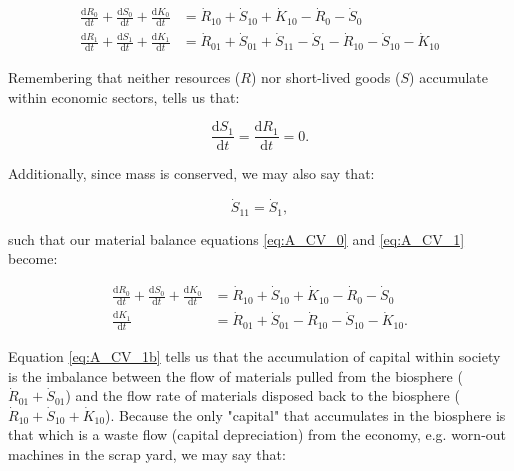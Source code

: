 \begin{align}
\label{eq:A_CV_0}
	\frac{\mathrm{d}R_0}{\mathrm{d}t}		
	+	\frac{\mathrm{d}S_0}{\mathrm{d}t}
	+	\frac{\mathrm{d}K_0}{\mathrm{d}t}		&	
	=	\dot{R}_{10}		
	+	\dot{S}_{10}	
	+	\dot{K}_{10}											
	-	\dot{R}_{0}											
	-	\dot{S}_{0}								\\
\label{eq:A_CV_1}
	\frac{\mathrm{d}R_{1}}{\mathrm{d}t}
	+ \frac{\mathrm{d}S_{1}}{\mathrm{d}t}
	+ \frac{\mathrm{d}K_{1}}{\mathrm{d}t}		&
	= \dot{R}_{01} 
	+ \dot{S}_{01} + \dot{S}_{11}
	- \dot{S}_{1}				
	- \dot{R}_{10}				
	- \dot{S}_{10}				
	- \dot{K}_{10}											
\end{align}

\noindent Remembering that neither resources ($R$) nor short-lived goods ($S$) accumulate within economic sectors, tells us that:

\begin{equation}\label{eq:A-dS_1/dt_zero}
	\frac{\mathrm{d}S_1}{\mathrm{d}t}
	= \frac{\mathrm{d}R_1}{\mathrm{d}t}
	= 0.
\end{equation}

\noindent Additionally, since mass is conserved, we may also say that:

\begin{equation}\label{eq:A_S11}
	\dot{S}_{11} = \dot{S}_{1},
\end{equation}

\noindent such that our material balance equations \ref{eq:A_CV_0} and \ref{eq:A_CV_1} 
become:


\begin{align}\label{eq:A_CV_0b}
	\frac{\mathrm{d}R_0}{\mathrm{d}t}		
	+	\frac{\mathrm{d}S_0}{\mathrm{d}t}
	+	\frac{\mathrm{d}K_0}{\mathrm{d}t}		&	
	=	\dot{R}_{10}		
	+	\dot{S}_{10}	
	+	\dot{K}_{10}											
	-	\dot{R}_{0}											
	-	\dot{S}_{0}								\\
	\label{eq:A_CV_1b}
	\frac{\mathrm{d}K_{1}}{\mathrm{d}t}		&
	= \dot{R}_{01} 
	+ \dot{S}_{01} 
	- \dot{R}_{10}				
	- \dot{S}_{10}				
	- \dot{K}_{10}.										
\end{align}

Equation \ref{eq:A_CV_1b} tells us that the accumulation of capital within society is the imbalance 
between the flow of materials pulled from the biosphere ($\dot{R}_{01} + \dot{S}_{01}$) and the 
flow rate of materials disposed back to the biosphere ($\dot{R}_{10} + \dot{S}_{10} + \dot{K}_{10}$). 
Because the only "capital" that accumulates in the biosphere is that which is a waste flow (capital depreciation)
from the economy, e.g. worn-out machines in the scrap yard, we may say that:

